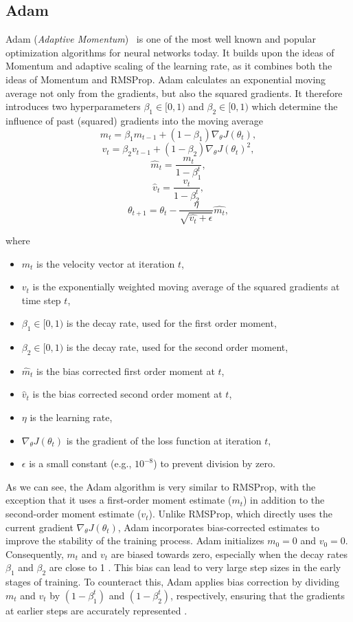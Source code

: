 \subsection{Adam}
\label{sec:adam}


Adam (\emph{Adaptive Momentum})~\cite{kingma2017adam} is one of the most well known and popular
optimization algorithms for neural networks today. It builds upon the ideas of Momentum and
adaptive scaling of the learning rate, as it combines both the ideas of Momentum and RMSProp.
Adam calculates an exponential moving average not only from the gradients, but also the squared gradients.
It therefore introduces two hyperparameters $\beta_1 \in [0,1)$ and $\beta_2 \in [0,1)$ which determine the
influence of past (squared) gradients into the moving average
\[m_t = \beta_1 m_{t-1} + (1 - \beta_1) \nabla_{\theta} J(\theta_t), \]
\[v_t = \beta_2 v_{t-1} + (1 - \beta_2) \nabla_{\theta} J(\theta_t)^2, \]
\[\hat{m}_t = \frac{m_t}{1-\beta_1^t}, \]
\[\hat{v}_t = \frac{v_t}{1-\beta_2^t}, \]
\[\theta_{t+1} = \theta_t - \frac{\eta}{\sqrt{\hat{v_t} + \epsilon}} \hat{m_t}, \]

where
\begin{itemize}
    \item $m_t$ is the velocity vector at iteration $t$,
    \item $v_t$ is the exponentially weighted moving average of the squared gradients at time step $t$,
    \item $\beta_1 \in [0, 1) $ is the decay rate, used for the first order moment,
    \item $\beta_2 \in [0, 1) $ is the decay rate,  used for the second order moment,
    \item $\hat{m}_t$ is the bias corrected first order moment at $t$,
    \item $\hat{v}_t$ is the bias corrected second order moment at $t$,
    \item $\eta$ is the learning rate,
    \item $\nabla_{\theta} J(\theta_t)$ is the gradient of the loss function at iteration $t$,
    \item $\epsilon$ is a small constant (e.g., $10^{-8}$) to prevent division by zero.
\end{itemize}
As we can see, the Adam algorithm is very similar to RMSProp, with the exception that it
uses a first-order moment estimate ($m_t$) in addition to the second-order moment estimate
($v_t$). Unlike RMSProp, which directly uses the current gradient
 $\nabla_{\theta} J(\theta_t)$, Adam incorporates bias-corrected estimates to improve the
stability of the training process.
Adam initializes $m_0 = 0$ and $v_0 = 0$. Consequently, $m_t$ and $v_t$ are biased towards
zero, especially when the decay rates $\beta_1$ and $\beta_2$ are close to 1 \cite{d2l2023adam}. This bias
can lead to very large step sizes in the early stages of training.\cite{Goodfellow-et-al-2016} To counteract this,
Adam applies bias correction by dividing $m_t$ and $v_t$ by $(1 - \beta_1^t)$ and
$(1 - \beta_2^t)$, respectively, ensuring that the gradients at earlier steps are
accurately represented \cite{d2l2023adam}.

